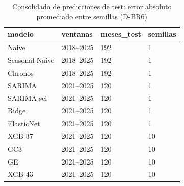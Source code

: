 \begin{table}[H]
\centering
\small
\caption{Consolidado de predicciones de test: error absoluto promediado entre semillas (D-BR6)}
\label{tab:Ta_consolidado_resumen}
\begin{tabular}{llll}
\toprule
modelo & ventanas & meses\_test & semillas \\
\midrule
Naive & 2018–2025 & 192 & 1 \\
Seasonal Naive & 2018–2025 & 192 & 1 \\
Chronos & 2018–2025 & 192 & 1 \\
SARIMA & 2021–2025 & 120 & 1 \\
SARIMA-sel & 2021–2025 & 120 & 1 \\
Ridge & 2021–2025 & 120 & 1 \\
ElasticNet & 2021–2025 & 120 & 1 \\
XGB-37 & 2021–2025 & 120 & 10 \\
GC3 & 2021–2025 & 120 & 10 \\
GE & 2021–2025 & 120 & 10 \\
XGB-43 & 2021–2025 & 120 & 10 \\
\bottomrule
\end{tabular}
\end{table}